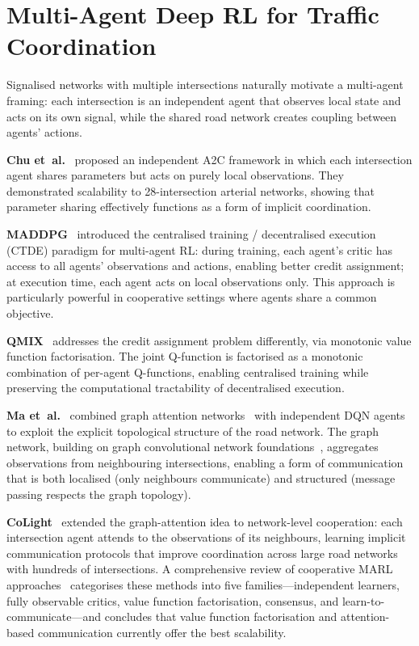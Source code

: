 \documentclass[12pt,oneside,a4paper]{report}
\begin{document}
\section{Multi-Agent Deep RL for Traffic Coordination}
\label{sec:lit_marl}

Signalised networks with multiple intersections naturally motivate
a multi-agent framing: each intersection is an independent agent
that observes local state and acts on its own signal, while the
shared road network creates coupling between agents' actions.

\textbf{Chu et~al.}~\cite{chu2020marl} proposed an independent A2C
framework in which each intersection agent shares parameters but
acts on purely local observations.  They demonstrated scalability
to 28-intersection arterial networks, showing that parameter sharing
effectively functions as a form of implicit coordination.

\textbf{MADDPG}~\cite{maddpg2017} introduced the centralised
training / decentralised execution (CTDE) paradigm for multi-agent
RL: during training, each agent's critic has access to all agents'
observations and actions, enabling better credit assignment; at
execution time, each agent acts on local observations only.  This
approach is particularly powerful in cooperative settings where
agents share a common objective.

\textbf{QMIX}~\cite{qmix2018} addresses the credit assignment
problem differently, via monotonic value function factorisation.
The joint Q-function is factorised as a monotonic combination of
per-agent Q-functions, enabling centralised training while
preserving the computational tractability of decentralised execution.

\textbf{Ma et~al.}~\cite{cctv2020} combined graph attention
networks~\cite{gat2018,transformer2017} with independent DQN agents to
exploit the explicit topological structure of the road network.  The
graph network, building on graph convolutional network foundations~\cite{gcn2017},
aggregates observations from neighbouring intersections, enabling
a form of communication that is both localised (only neighbours
communicate) and structured (message passing respects the graph
topology).

\textbf{CoLight}~\cite{colight2019} extended the graph-attention idea to
network-level cooperation: each intersection agent attends to the observations
of its neighbours, learning implicit communication protocols that improve
coordination across large road networks with hundreds of intersections.
A comprehensive review of cooperative MARL approaches~\cite{coopmarlreview2023}
categorises these methods into five families---independent learners, fully
observable critics, value function factorisation, consensus, and
learn-to-communicate---and concludes that value function factorisation
and attention-based communication currently offer the best scalability.
\end{document}
